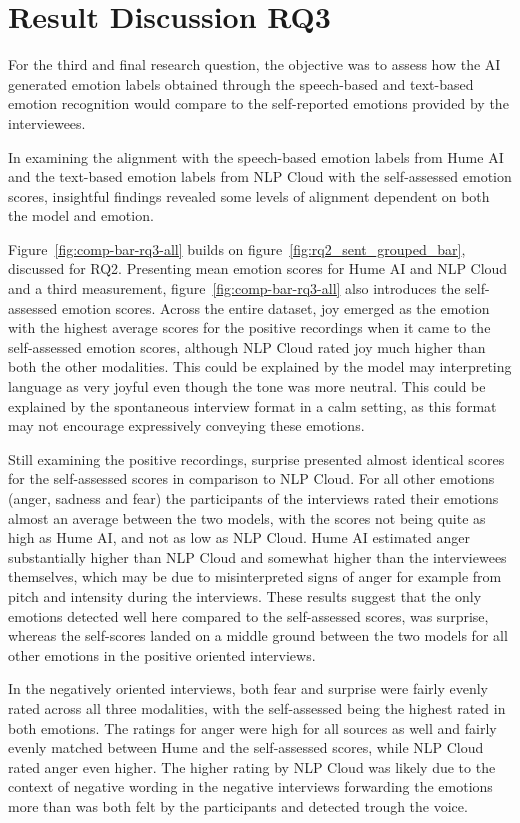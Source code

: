 
\section{Result Discussion RQ3}
For the third and final research question, the objective was to assess how the AI generated emotion labels obtained through the speech-based and text-based emotion recognition would compare to the self-reported emotions provided by the interviewees.

In examining the alignment with the speech-based emotion labels from Hume AI and the text-based emotion labels from NLP Cloud with the self-assessed emotion scores, insightful findings revealed some levels of alignment dependent on both the model and emotion.

Figure~\ref{fig:comp-bar-rq3-all} builds on figure~\ref{fig:rq2_sent_grouped_bar}, discussed for RQ2. Presenting mean emotion scores for Hume AI and NLP Cloud and a third measurement, figure~\ref{fig:comp-bar-rq3-all} also introduces the self-assessed emotion scores.
Across the entire dataset, joy emerged as the emotion with the highest average scores for the positive recordings when it came to the self-assessed emotion scores, although NLP Cloud rated joy much higher than both the other modalities. This could be explained by the model may interpreting language as very joyful even though the tone was more neutral. This could be explained by the spontaneous interview format in a calm setting, as this format may not encourage expressively conveying these emotions.

Still examining the positive recordings, surprise presented almost identical scores for the self-assessed scores in comparison to NLP Cloud. For all other emotions (anger, sadness and fear) the participants of the interviews rated their emotions almost an average between the two models, with the scores not being quite as high as Hume AI, and not as low as NLP Cloud. Hume AI estimated anger substantially higher than NLP Cloud and somewhat higher than the interviewees themselves, which may be due to misinterpreted signs of anger for example from pitch and intensity during the interviews.
These results suggest that the only emotions detected well here compared to the self-assessed scores, was surprise, whereas the self-scores landed on a middle ground between the two models for all other emotions in the positive oriented interviews.

In the negatively oriented interviews, both fear and surprise were fairly evenly rated across all three modalities, with the self-assessed being the highest rated in both emotions.
The ratings for anger were high for all sources as well and fairly evenly matched between Hume and the self-assessed scores, while NLP Cloud rated anger even higher. The higher rating by NLP Cloud was likely due to the context of negative wording in the negative interviews forwarding the emotions more than was both felt by the participants and detected trough the voice.

